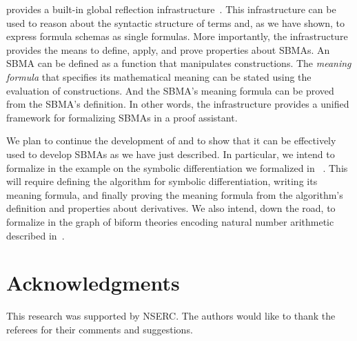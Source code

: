 \documentclass[fleqn]{llncs}
\begin{document}
{\HLQE} provides a built-in global reflection
infrastructure~\cite{Farmer18}.  This infrastructure can be used
to reason about the syntactic structure of terms and, as we have
shown, to express formula schemas as single formulas.  More
importantly, the infrastructure provides the means to define, apply,
and prove properties about SBMAs.  An SBMA can be defined as a
function that manipulates constructions.  The \emph{meaning formula}
that specifies its mathematical meaning can be stated using the
evaluation of constructions.  And the SBMA's meaning formula can be
proved from the SBMA's definition. In other words, the infrastructure
provides a unified framework for formalizing SBMAs in a proof
assistant.

We plan to continue the development of {\HLQE} and to show that it can
be effectively used to develop SBMAs as we have just described.  In
particular, we intend to formalize in {\HLQE} the example on the
symbolic differentiation we formalized in {\churchqe}~\cite{Farmer18}.
This will require defining the algorithm for symbolic differentiation,
writing its meaning formula, and finally proving the meaning formula
from the algorithm's definition and properties about derivatives.  We
also intend, down the road, to formalize in {\HLQE} the graph of
biform theories encoding natural number arithmetic described
in~\cite{CaretteFarmer17}.

\section*{Acknowledgments} 

This research was supported by NSERC.  The authors would like to thank
the referees for their comments and suggestions.




\end{document}
